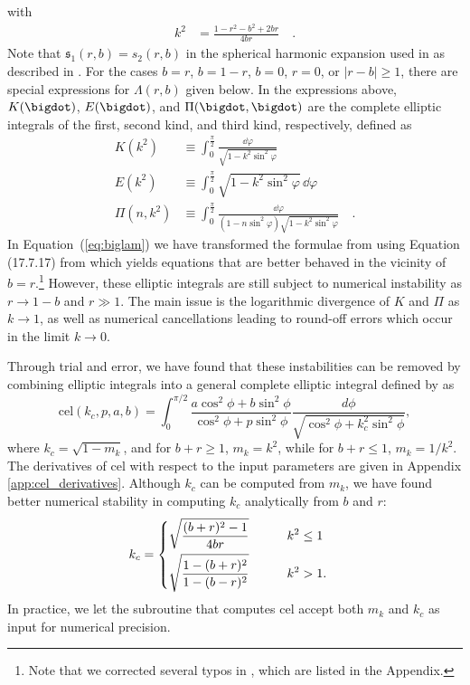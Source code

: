 \documentclass[modern,trackchanges]{aastex63}
\begin{document}
\endgroup
%
with
%
\begin{align}
    \label{eq:k2}
    k^2 &= \frac{1 - r^2 - b^2 + 2 b r}{4 b r}
    \quad.
\end{align}
Note that $\mathfrak{s}_1(r,b) = s_2(r,b)$ in the spherical harmonic expansion used in \starry as
described in \citet{starry}.
For the cases $b=r$, $b=1-r$, $b=0$, $r=0$, or $\vert r-b\vert \ge 1$, there are special
expressions for $\Lambda(r,b)$ given below.
%
In the expressions above, $K(\bigdot)$, $E(\bigdot)$, and $\Pi(\bigdot, \bigdot)$
are the complete elliptic integrals of the first, second kind, and third kind,
respectively, defined as
%
\begin{align}
    \label{eq:elliptic}
    K(k^2) &\equiv \int_0^{\frac{\pi}{2}} \frac{\dd \varphi}{\sqrt{1 - k^2 \sin^2 \varphi}}
    \nonumber \\[0.5em]
    E(k^2) &\equiv \int_0^{\frac{\pi}{2}} \sqrt{1 - k^2 \sin^2 \varphi} \, \dd \varphi
    \nonumber \\[0.5em]
    \Pi(n, k^2) &\equiv \int_0^{\frac{\pi}{2}} \frac{\dd \varphi}{(1 - n \sin^2 \varphi)\sqrt{1 - k^2 \sin^2 \varphi}}
    \quad.
\end{align}
In Equation~(\ref{eq:biglam}) we have transformed the formulae from \citet{MandelAgol2002} using
Equation (17.7.17) from \citet{Abramowitz1970} which yields equations that are better
behaved in the vicinity of $b=r$.\footnote{Note that we corrected several typos
in \citet{MandelAgol2002}, which are listed in the Appendix.}  However, these elliptic
integrals are still subject to numerical instability as $r \rightarrow 1-b$ and $r \gg 1$.
The main issue is the logarithmic divergence of $K$ and $\Pi$ as $k \rightarrow 1$, as
well as numerical cancellations leading to round-off errors which occur in the
limit $k \rightarrow 0$.

Through trial and error, we have found that these instabilities can be removed by combining
elliptic integrals into a general complete elliptic integral defined by \citet{Bulirsch1969} as
\begin{equation}\label{eq:cel}
\mathrm{cel}(k_c,p,a,b) = \int_0^{\pi/2} \frac{a\cos^2{\phi} + b\sin^2{\phi}}{\cos^2{\phi}+p\sin^2{\phi}} \frac{d\phi}{\sqrt{\cos^2{\phi}+k_c^2\sin^2{\phi}}},
\end{equation}
where $k_c = \sqrt{1-m_k}$, and for $b+r \ge 1$,
$m_k=k^2$, while for $b+r \le 1$, $m_k=1/k^2$.  The derivatives of
$\mathrm{cel}$ with respect to the input parameters are given in Appendix \ref{app:cel_derivatives}.
Although $k_c$ can be computed from
$m_k$, we have found better numerical stability in computing $k_c$ analytically
from $b$ and $r$:
\begin{align}
    k_c &=
    \begin{dcases}
     \sqrt{\frac{(b+r)^2-1}{4br}} & \qquad k^2 \le 1\\
     \sqrt{\frac{1-(b+r)^2}{1-(b-r)^2}} & \qquad k^2 > 1.
   \end{dcases}
\end{align}
In practice, we let the subroutine that computes $\mathrm{cel}$ accept both
$m_k$ and $k_c$ as input for numerical precision.
\end{document}

